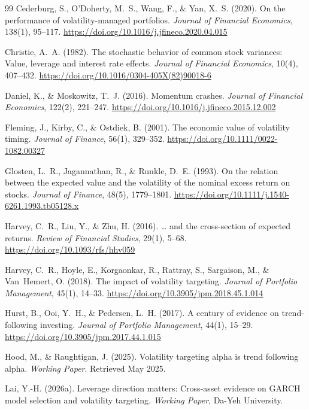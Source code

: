\begin{thebibliography}{99}
Cederburg, S., O'Doherty, M.~S., Wang, F., \& Yan, X.~S. (2020). On the performance of volatility-managed portfolios. \textit{Journal of Financial Economics}, 138(1), 95--117. \url{https://doi.org/10.1016/j.jfineco.2020.04.015}

Christie, A.~A. (1982). The stochastic behavior of common stock variances: Value, leverage and interest rate effects. \textit{Journal of Financial Economics}, 10(4), 407--432. \url{https://doi.org/10.1016/0304-405X(82)90018-6}

Daniel, K., \& Moskowitz, T.~J. (2016). Momentum crashes. \textit{Journal of Financial Economics}, 122(2), 221--247. \url{https://doi.org/10.1016/j.jfineco.2015.12.002}

Fleming, J., Kirby, C., \& Ostdiek, B. (2001). The economic value of volatility timing. \textit{Journal of Finance}, 56(1), 329--352. \url{https://doi.org/10.1111/0022-1082.00327}

Glosten, L.~R., Jagannathan, R., \& Runkle, D.~E. (1993). On the relation between the expected value and the volatility of the nominal excess return on stocks. \textit{Journal of Finance}, 48(5), 1779--1801. \url{https://doi.org/10.1111/j.1540-6261.1993.tb05128.x}

Harvey, C.~R., Liu, Y., \& Zhu, H. (2016). \ldots{} and the cross-section of expected returns. \textit{Review of Financial Studies}, 29(1), 5--68. \url{https://doi.org/10.1093/rfs/hhv059}

Harvey, C.~R., Hoyle, E., Korgaonkar, R., Rattray, S., Sargaison, M., \& Van~Hemert, O. (2018). The impact of volatility targeting. \textit{Journal of Portfolio Management}, 45(1), 14--33. \url{https://doi.org/10.3905/jpm.2018.45.1.014}

Hurst, B., Ooi, Y.~H., \& Pedersen, L.~H. (2017). A century of evidence on trend-following investing. \textit{Journal of Portfolio Management}, 44(1), 15--29. \url{https://doi.org/10.3905/jpm.2017.44.1.015}

Hood, M., \& Raughtigan, J. (2025). Volatility targeting alpha is trend following alpha. \textit{Working Paper}. Retrieved May 2025.

Lai, Y.-H. (2026a). Leverage direction matters: Cross-asset evidence on GARCH model selection and volatility targeting. \textit{Working Paper}, Da-Yeh University.


\end{thebibliography}

